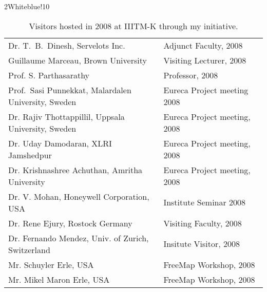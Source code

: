 \documentclass[titlepage, %
11pt, 
]{article}
\begin{document}
\begin{table}
\rowcolors%
{2}{White}{blue!10}
\setlength\extrarowheight{4pt}
\begin{tabular}%
{|p{0.6\linewidth}|p{0.6\linewidth}|}
\hline
\multicolumn{1}{|m{0.6\linewidth}|}{\centering {\bf Person and Affiliation}}&
\multicolumn{1}{m{0.6\linewidth}|}{\centering {\bf Event and Date}}\\
\hline
Dr. T.~B.~Dinesh, Servelots Inc. & Adjunct Faculty, 2008\\
%
Guillaume Marceau, Brown University & Visiting Lecturer, 2008\\
%
Prof. S. Parthasarathy & Professor, 2008\\
%
Prof.~Sasi Punnekkat, Malardalen University, Sweden & Eureca Project meeting 2008\\
%
Dr. Rajiv Thottappillil, Uppsala University, Sweden & Eureca Project meeting, 2008\\
%
Dr. Uday Damodaran, XLRI Jamshedpur  & Eureca Project meeting, 2008\\
%
Dr. Krishnashree Achuthan, Amritha University  & Eureca Project meeting, 2008\\
%
Dr. V. Mohan, Honeywell Corporation, USA & Institute Seminar 2008\\
%
Dr. Rene Ejury, Rostock Germany & Visiting Faculty, 2008\\
%
Dr. Fernando Mendez, Univ. of Zurich, Switzerland & Insitute Visitor, 2008\\
%
Mr. Schuyler Erle, USA & FreeMap Workshop, 2008\\
%
Mr. Mikel Maron Erle, USA & FreeMap Workshop, 2008\\
\hline
\end{tabular}
\caption{Visitors  hosted in 2008 at IIITM-K through my initiative.  \label{tbl:visitors-2008}}
\end{table}
\end{document}
